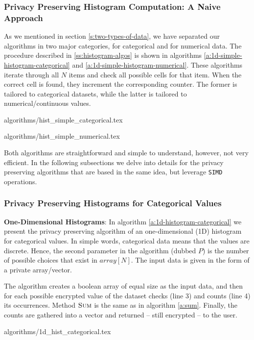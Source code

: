 \subsubsection{Privacy Preserving Histogram Computation: A Naive Approach}\label{sss:histogram-simple}
As we mentioned in section \ref{s:two-types-of-data}, we have separated our algorithms in two major categories, for categorical and for numerical data.
The procedure described in \ref{ss:histogram-algos} is shown in algorithms \ref{a:1d-simple-histogram-categorical} and \ref{a:1d-simple-histogram-numerical}.
These algorithms iterate through all $N$ items and check all possible cells for that item.
When the correct cell is found, they increment the corresponding counter.
The former is tailored to categorical datasets, while the latter is tailored to numerical/continuous values.

{algorithms/hist_simple_categorical.tex}

{algorithms/hist_simple_numerical.tex}

Both algorithms are straightforward and simple to understand, however, not very efficient.
In the following subsections we delve into details for the privacy preserving algorithms that are based in the same idea, but leverage \texttt{SIMD} operations.


\subsubsection{Privacy Preserving Histograms for Categorical Values}\label{sss:histogram-categorical}
\textbf{One-Dimensional Histograms}: In algorithm \ref{a:1d-histogram-categorical} we present the privacy preserving algorithm of an one-dimensional (1D) histogram for categorical values.
In simple words, categorical data means that the values are discrete.
Hence, the second parameter in the algorithm (dubbed $P$) is the number of possible choices that exist in $array[N]$.
The input data is given in the form of a private array/vector.

The algorithm creates a boolean array of equal size as the input data, and then for each possible encrypted value of the dataset checks (line 3) and counts (line 4) its occurrences.
Method { $\textsc{Sum}$} is the same as in algorithm \ref{a:sum}.
Finally, the counts are gathered into a vector and returned -- still encrypted -- to the user.

{algorithms/1d_hist_categorical.tex}



